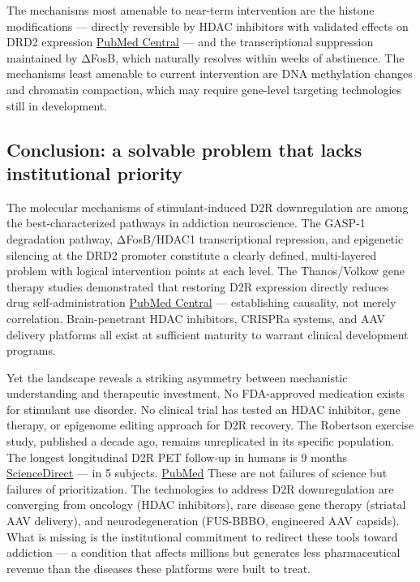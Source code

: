 The mechanisms most amenable to near-term intervention are the histone modifications --- directly reversible by HDAC inhibitors with validated effects on DRD2 expression \href{https://pmc.ncbi.nlm.nih.gov/articles/PMC8526546/}{PubMed Central} --- and the transcriptional suppression maintained by ΔFosB, which naturally resolves within weeks of abstinence. The mechanisms least amenable to current intervention are DNA methylation changes and chromatin compaction, which may require gene-level targeting technologies still in development.

\subsection{Conclusion: a solvable problem that lacks institutional priority}\label{15_d2_downregulation-conclusion-a-solvable-problem-that-lacks-institutional-priority}

The molecular mechanisms of stimulant-induced D2R downregulation are among the best-characterized pathways in addiction neuroscience. The GASP-1 degradation pathway, ΔFosB/HDAC1 transcriptional repression, and epigenetic silencing at the DRD2 promoter constitute a clearly defined, multi-layered problem with logical intervention points at each level. The Thanos/Volkow gene therapy studies demonstrated that restoring D2R expression directly reduces drug self-administration \href{https://pmc.ncbi.nlm.nih.gov/articles/PMC10411139/}{PubMed Central} --- establishing causality, not merely correlation. Brain-penetrant HDAC inhibitors, CRISPRa systems, and AAV delivery platforms all exist at sufficient maturity to warrant clinical development programs.

Yet the landscape reveals a striking asymmetry between mechanistic understanding and therapeutic investment. No FDA-approved medication exists for stimulant use disorder. No clinical trial has tested an HDAC inhibitor, gene therapy, or epigenome editing approach for D2R recovery. The Robertson exercise study, published a decade ago, remains unreplicated in its specific population. The longest longitudinal D2R PET follow-up in humans is 9 months \href{https://www.sciencedirect.com/science/article/abs/pii/S1053811915006461}{ScienceDirect} --- in 5 subjects. \href{https://pubmed.ncbi.nlm.nih.gov/11717374/}{PubMed} These are not failures of science but failures of prioritization. The technologies to address D2R downregulation are converging from oncology (HDAC inhibitors), rare disease gene therapy (striatal AAV delivery), and neurodegeneration (FUS-BBBO, engineered AAV capsids). What is missing is the institutional commitment to redirect these tools toward addiction --- a condition that affects millions but generates less pharmaceutical revenue than the diseases these platforms were built to treat.

